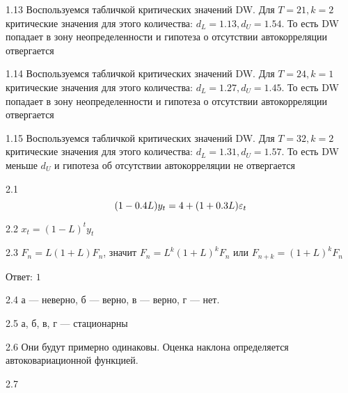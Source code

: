 \protect \hypertarget {soln:1.13}{}
\begin{solution}{{1.13}}
Воспользуемся табличкой критических значений DW. 
Для $T = 21, k = 2$ критические значения для этого количества: $d_L = 1.13, d_U = 1.54$. 
То есть DW попадает в зону неопределенности и гипотеза о отсутствии автокорреляции отвергается
\end{solution}

\protect \hypertarget {soln:1.14}{}
\begin{solution}{{1.14}}
Воспользуемся табличкой критических значений DW. 
Для $T = 24, k = 1$ критические значения для этого количества: $d_L = 1.27, d_U = 1.45$. 
То есть DW попадает в зону неопределенности и гипотеза о отсутствии автокорреляции отвергается
\end{solution}

\protect \hypertarget {soln:1.15}{}
\begin{solution}{{1.15}}
Воспользуемся табличкой критических значений DW. 
Для $T = 32, k = 2$ критические значения для этого количества: $d_L = 1.31, d_U = 1.57$. 
То есть DW меньше  $d_U$ и гипотеза об отсутствии автокорреляции не отвергается
\end{solution}
\protect \hypertarget {soln:2.1}{}
\begin{solution}{{2.1}}
\[
(1 - 0.4L)y_t = 4 + (1 + 0.3L)\varepsilon_t
\]
\end{solution}
\protect \hypertarget {soln:2.2}{}
\begin{solution}{{2.2}}
$x_{t}=(1-L)^{t}y_{t}$
\end{solution}
\protect \hypertarget {soln:2.3}{}
\begin{solution}{{2.3}}
$ F_{n}=L(1+L)F_{n} $, значит $ F_{n}=L^{k}(1+L)^{k}F_{n} $ или $ F_{n+k}=(1+L)^{k}F_{n} $

Ответ: $1$
\end{solution}
\protect \hypertarget {soln:2.4}{}
\begin{solution}{{2.4}}
а — неверно, б — верно, в — верно, г — нет.
\end{solution}
\protect \hypertarget {soln:2.5}{}
\begin{solution}{{2.5}}
а, б, в, г — стационарны
\end{solution}
\protect \hypertarget {soln:2.6}{}
\begin{solution}{{2.6}}
Они будут примерно одинаковы. Оценка наклона определяется автоковариационной функцией.
\end{solution}
\protect \hypertarget {soln:2.7}{}
\begin{solution}{{2.7}}

\end{solution}
